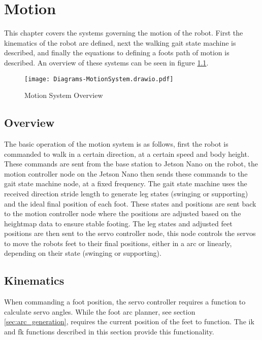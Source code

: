\chapter{Motion} \label{chap:motion}
    This chapter covers the systems governing the motion of the robot. First the kinematics of the robot are defined, next the walking gait state machine is
    described, and finally the equations to defining a foots path of motion is described. An overview of these systems can be seen in figure \ref{fig:motion_system}.
    \begin{figure}[h]
        \centering
        \texttt{[image: Diagrams-MotionSystem.drawio.pdf]}
        \caption{Motion System Overview}
        \label{fig:motion_system}
    \end{figure}
    \section{Overview}
        The basic operation of the motion system is as follows, first the robot is commanded to walk in a certain direction, at a
        certain speed and body height. These commands are sent from the base station to Jetson Nano on the robot,
        the motion controller node on the Jetson Nano then sends these commands to the gait state machine node, at a fixed frequency.
        The gait state machine uses the received direction stride length to generate leg states (swinging or supporting) and the ideal
        final position of each foot. These states and positions are sent back to the motion controller node where the positions are adjusted
        based on the heightmap data to ensure stable footing. The leg states and adjusted feet positions are then sent to the servo 
        controller node, this node controls the servos to move the robots feet to their final positions, either in a arc or linearly,
        depending on their state (swinging or supporting). %

    \section{Kinematics}
        When commanding a foot position, the servo controller requires a function to calculate servo angles. While the foot arc planner, see section 
        \ref{sec:arc_generation}, requires the current position of the feet to function. The \ac{ik} and \ac{fk} functions described in this section provide
        this functionality. 
        
